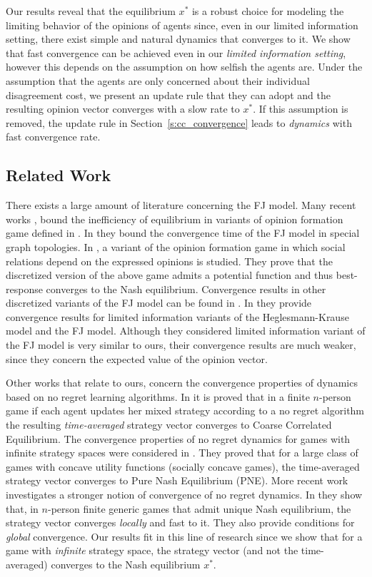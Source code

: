 Our results reveal that the equilibrium $x^*$ is a robust choice for modeling
the limiting behavior of the opinions of agents since, even in our limited
information setting, there exist simple and natural dynamics that converges
to it.  We show that fast convergence can be achieved even in
our \emph{limited information setting}, however this depends on
the assumption on how selfish the agents are. Under the assumption that
the agents are only concerned about their individual disagreement cost,
we present an update rule that they can adopt and the resulting opinion
vector converges with a slow rate to $x^*$. If this assumption is removed,
the update rule in Section~\ref{s:cc_convergence} leads to \emph{dynamics}
with fast convergence rate.


\subsection{Related Work}

There exists a large amount of literature concerning the FJ model.  Many recent
works \cite{BGM13,CKO13}, \cite{BFM16,EFHS17} bound the inefficiency of
equilibrium in variants of opinion formation game defined in \cite{BKO11}. In
\cite{GS14} they bound the convergence time of the FJ model in special graph
topologies.  In \cite{BFM16}, a variant of the opinion formation game in which
social relations depend on the expressed opinions is studied.  They prove that
the discretized version of the above game admits a potential function and thus
best-response converges to the Nash equilibrium.  Convergence results in other
discretized variants of the FJ model can be found in \cite{YOASS13,FGV16}. In
\cite{FPS16} they provide convergence results for limited information variants
of the Heglesmann-Krause model \cite{HK} and the FJ model. Although they
considered limited information variant of the FJ model is very similar to ours,
their convergence results are much weaker, since they concern the expected
value of the opinion vector.

Other works that relate to ours, concern the convergence properties of dynamics
based on no regret learning algorithms.  In \cite{FV97,FS99,SA00,SALS15} it is
proved that in a finite $n$-person game if each agent updates her mixed
strategy according to a no regret algorithm the resulting \emph{time-averaged}
strategy vector converges to Coarse Correlated Equilibrium. The convergence
properties of no regret dynamics for games with infinite strategy spaces were
considered in \cite{EMN09}.  They proved that for a large class of games with
concave utility functions (socially concave games), the time-averaged strategy
vector converges to Pure Nash Equilibrium (PNE). More recent work investigates
a stronger notion of convergence of no regret dynamics. In \cite{CHM17} they
show that, in $n$-person finite generic games that admit unique Nash
equilibrium, the strategy vector converges \emph{locally} and fast to it.  They
also provide conditions for \emph{global} convergence.  Our results fit in this
line of research since we show that for a game with \emph{infinite} strategy
space, the strategy vector (and not the time-averaged) converges to the Nash
equilibrium $x^*$.

